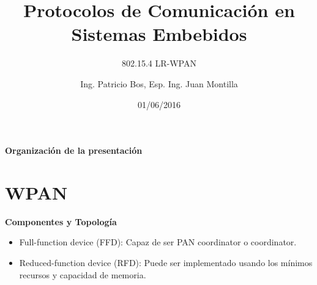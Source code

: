 \documentclass[aspectratio=169]{beamer}
\title[802.15.4 LR-WPAN]{Protocolos de Comunicación en Sistemas Embebidos}
\subtitle{802.15.4 LR-WPAN}
\author[]{Ing. Patricio Bos, Esp. Ing. Juan Montilla}
\institute[LSE-FIUBA]{Laboratorio de Sistemas Embebidos - FIUBA}
\date{01/06/2016}
\begin{document}
\begingroup
\makeatletter
\setlength{\hoffset}{-.5\beamer@sidebarwidth}
\makeatother
\begin{frame}
  \titlepage
\end{frame}

\endgroup



\begin{frame}{\textbf{Organización de la presentación}}
  \tableofcontents
\end{frame}
%
%
%
\section{WPAN}

\begin{frame}{\textbf{Componentes y Topología}}
\begin{minipage}[c]{1.0\linewidth}

	\begin{minipage}[c]{0.6\linewidth}
		\begin{itemize}
			\item Full-function device (FFD): Capaz de ser PAN coordinator o coordinator. 
			\vspace{10px}
			\item Reduced-function device (RFD): Puede ser implementado usando los mínimos recursos y capacidad de memoria.
			\vspace{10px}
	  	\end{itemize}	
	\end{minipage}

	\begin{minipage}[c]{0.35\linewidth}
		\begin{figure}[H]
		\end{figure}	  	  	
	\end{minipage}

\end{minipage}
\end{frame}
\end{document}
